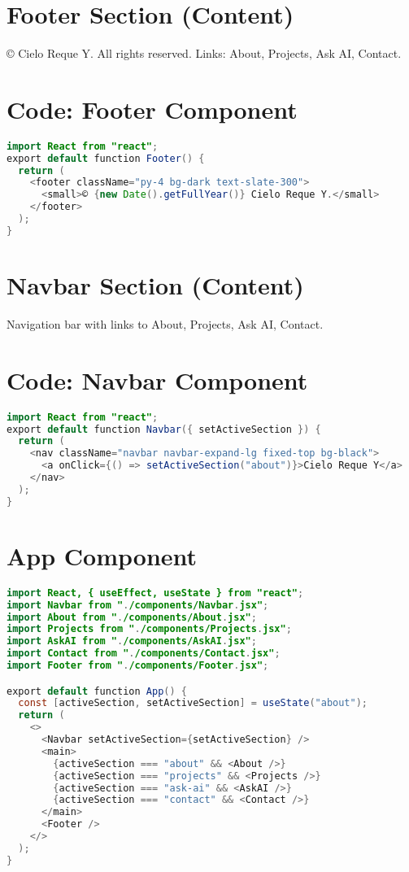 \documentclass[11pt]{article}
\begin{document}
\section*{Footer Section (Content)}
© Cielo Reque Y. All rights reserved. Links: About, Projects, Ask AI, Contact.

\section*{Code: Footer Component}
\begin{lstlisting}[language=Java]
import React from "react";
export default function Footer() {
  return (
    <footer className="py-4 bg-dark text-slate-300">
      <small>© {new Date().getFullYear()} Cielo Reque Y.</small>
    </footer>
  );
}
\end{lstlisting}

\section*{Navbar Section (Content)}
Navigation bar with links to About, Projects, Ask AI, Contact.

\section*{Code: Navbar Component}
\begin{lstlisting}[language=Java]
import React from "react";
export default function Navbar({ setActiveSection }) {
  return (
    <nav className="navbar navbar-expand-lg fixed-top bg-black">
      <a onClick={() => setActiveSection("about")}>Cielo Reque Y</a>
    </nav>
  );
}
\end{lstlisting}

\section*{App Component}
\begin{lstlisting}[language=Java]
import React, { useEffect, useState } from "react";
import Navbar from "./components/Navbar.jsx";
import About from "./components/About.jsx";
import Projects from "./components/Projects.jsx";
import AskAI from "./components/AskAI.jsx";
import Contact from "./components/Contact.jsx";
import Footer from "./components/Footer.jsx";

export default function App() {
  const [activeSection, setActiveSection] = useState("about");
  return (
    <>
      <Navbar setActiveSection={setActiveSection} />
      <main>
        {activeSection === "about" && <About />}
        {activeSection === "projects" && <Projects />}
        {activeSection === "ask-ai" && <AskAI />}
        {activeSection === "contact" && <Contact />}
      </main>
      <Footer />
    </>
  );
}
\end{lstlisting}
\end{document}
